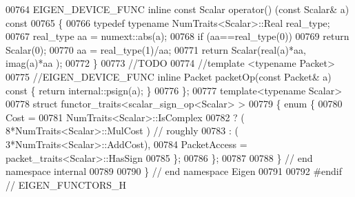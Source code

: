 \begin{DoxyCode}
00764   EIGEN\_DEVICE\_FUNC \textcolor{keyword}{inline} \textcolor{keyword}{const} Scalar operator() (\textcolor{keyword}{const} Scalar& a)\textcolor{keyword}{ const}
00765 \textcolor{keyword}{  }\{
00766     \textcolor{keyword}{typedef} \textcolor{keyword}{typename} NumTraits<Scalar>::Real real\_type;
00767     real\_type aa = numext::abs(a);
00768     \textcolor{keywordflow}{if} (aa==real\_type(0))
00769       \textcolor{keywordflow}{return} Scalar(0);
00770     aa = real\_type(1)/aa;
00771     \textcolor{keywordflow}{return} Scalar(real(a)*aa, imag(a)*aa );
00772   \}
00773   \textcolor{comment}{//TODO}
00774   \textcolor{comment}{//template <typename Packet>}
00775   \textcolor{comment}{//EIGEN\_DEVICE\_FUNC inline Packet packetOp(const Packet& a) const \{ return internal::psign(a); \}}
00776 \};
00777 \textcolor{keyword}{template}<\textcolor{keyword}{typename} Scalar>
00778 \textcolor{keyword}{struct }functor\_traits<scalar\_sign\_op<Scalar> >
00779 \{ \textcolor{keyword}{enum} \{
00780     Cost = 
00781         NumTraits<Scalar>::IsComplex
00782         ? ( 8*NumTraits<Scalar>::MulCost  ) \textcolor{comment}{// roughly}
00783         : ( 3*NumTraits<Scalar>::AddCost),
00784     PacketAccess = packet\_traits<Scalar>::HasSign
00785   \};
00786 \};
00787 
00788 \} \textcolor{comment}{// end namespace internal}
00789 
00790 \} \textcolor{comment}{// end namespace Eigen}
00791 
00792 \textcolor{preprocessor}{#endif // EIGEN\_FUNCTORS\_H}
\end{DoxyCode}
